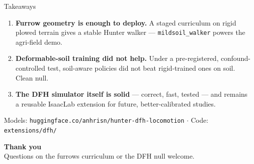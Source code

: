 \documentclass[aspectratio=169,10pt]{beamer}
\begin{document}
\begin{frame}{Takeaways}
  \begin{enumerate}
    \item \textbf{Furrow geometry is enough to deploy.} A staged curriculum on
          rigid plowed terrain gives a stable Hunter walker ---
          \texttt{mildsoil\_walker} powers the agri-field demo.
    \item \textbf{Deformable-soil training did not help.} Under a pre-registered,
          confound-controlled test, soil-aware policies did not beat rigid-trained
          ones on soil. Clean null.
    \item \textbf{The DFH simulator itself is solid} --- correct, fast, tested ---
          and remains a reusable IsaacLab extension for future, better-calibrated
          studies.
  \end{enumerate}

  \vspace{1.2em}
  \begin{center}
    \footnotesize Models: \texttt{huggingface.co/anhrisn/hunter-dfh-locomotion} \quad$\cdot$\quad
    Code: \texttt{extensions/dfh/}
  \end{center}
\end{frame}

\begin{frame}[plain]
  \begin{center}
    {\Large\textbf{Thank you}}\\[0.6em]
    Questions on the furrows curriculum or the DFH null welcome.
  \end{center}
\end{frame}
\end{document}
